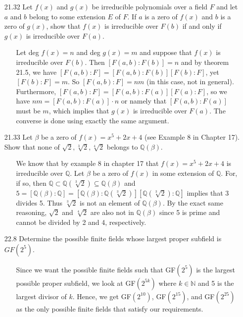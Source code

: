 \documentclass[12pt]{article}
\begin{document}
\begin{enumerate}
\item[21.32] Let $f(x)$ and $g(x)$ be irreducible polynomials over a field $F$ and let $a$ and
$b$ belong to some extension $E$ of $F$. If $a$ is a zero of $f(x)$ and $b$ is a zero of
$g(x)$, show that $f(x)$ is irreducible over $F(b)$ if and only if $g(x)$ is irreducible over
$F(a)$.
\begin{enumerate}
\item[] Let deg $f(x) = n$ and deg $g(x) = m$ and 
suppose that $f(x)$ is irreducible over $F(b)$. Then $[F(a, b):F(b)] = n$ and 
by theorem 21.5, we have $[F(a, b):F] = [F(a, b):F(b)][F(b):F]$, yet
$[F(b):F] = m$. So $[F(a, b):F] = nm$ (in this case, not in general). Furthermore, 
$[F(a, b):F] = [F(a, b):F(a)][F(a):F]$, so we have $nm = [F(a, b):F(a)] \cdot n$ 
or namely that $[F(a, b):F(a)]$ must be $m$, which implies that $g(x)$ is 
irreducible over $F(a)$. The converse is done using exactly the same argument.
\end{enumerate}

\item[21.33] Let $\beta$ be a zero of $f(x) = x^5 + 2x + 4$ (see Example 8 in Chapter 17).
Show that none of $\sqrt{2}, \sqrt[3]{2}, \sqrt[4]{2}$ belongs to $\mathbb{Q}(\beta)$.
\begin{enumerate}
\item[] We know that by example 8 in chapter 17 that $f(x) = x^5 + 2x + 4$ is irreducible
over $\mathbb{Q}$. Let $\beta$ be a zero of $f(x)$ in some extension of $\mathbb{Q}$. For,
if so, then $\mathbb{Q} \subset \mathbb{Q}(\sqrt[3]{2}) \subseteq \mathbb{Q}(\beta)$ and
$5 = [\mathbb{Q}(\beta) : \mathbb{Q}] = 
[\mathbb{Q}(\beta) : \mathbb{Q}(\sqrt[3]{2})][\mathbb{Q}(\sqrt[3]{2}) : \mathbb{Q}]$ implies
that 3 divides 5. Thus $\sqrt[3]{2}$ is not an element of $\mathbb{Q}(\beta)$. By the exact
same reasoning, $\sqrt{2}$ and $\sqrt[4]{2}$ are also not in $\mathbb{Q}(\beta)$ since
5 is prime and cannot be divided by 2 and 4, respectively.
\end{enumerate}

\item[22.8] Determine the possible finite fields whose largest proper subfield is $GF(2^5)$.
\begin{enumerate}
\item[] Since we want the possible finite fields such that GF$(2^5)$ is the largest
possible proper subfield, we look at GF$(2^{5k})$ where $k \in \mathbb{N}$ and 
5 is the largest divisor of $k$. Hence, we get 
GF$(2^{10})$, GF$(2^{15})$, and GF$(2^{25})$ as the only possible finite
fields that satisfy our requirements.
\end{enumerate}


\end{enumerate}
\end{document}
